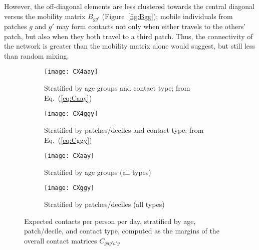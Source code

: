 However, the off-diagonal elements are less clustered towards the central diagonal
versus the mobility matrix $B_{gg'}$ (Figure~\ref{fig:Bgg});
mobile individuals from patches $g$ and $g'$ may form contacts
not only when either travels to the others' patch,
but also when they both travel to a third patch.
Thus, the connectivity of the network is greater than the mobility matrix alone would suggest,
but still less than random mixing.
\begin{figure}
  \begin{subfigure}{\linewidth}
    \texttt{[image: CX4aay]}
    \caption{Stratified by age groups and contact type; from Eq.~(\ref{eq:Caay})}
    \label{fig:CX4aay}
  \end{subfigure}
  \begin{subfigure}{\linewidth}
    \texttt{[image: CX4ggy]}
    \caption{Stratified by patches/deciles and contact type; from Eq.~(\ref{eq:Cggy})}
    \label{fig:CX4ggy}
  \end{subfigure}
  \begin{subfigure}{0.48\linewidth}
    \centering
    \texttt{[image: CXaay]}
    \caption{Stratified by age groups (all types)}
    \label{fig:CXaay}
  \end{subfigure}\hfill%
  \begin{subfigure}{0.48\linewidth}
    \centering
    \texttt{[image: CXggy]}
    \caption{Stratified by patches/deciles (all types)}
    \label{fig:CXggy}
  \end{subfigure}
  \caption{Expected contacts per person per day, stratified by age, patch/decile, and contact type,
    computed as the margins of the overall contact matrices $C_{gag'a'y}$}
  \label{fig:CX4y}
\end{figure}